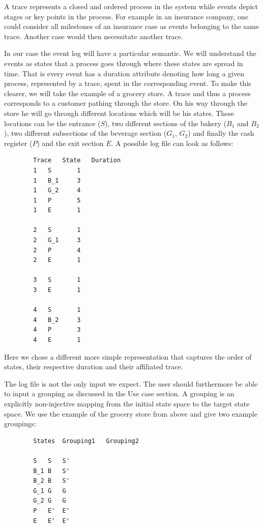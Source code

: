 \documentclass[12pt]{extarticle}
\begin{document}
A trace represents a closed and ordered process in the system while events depict stages or key points in the process. For example in an insurance company, one could consider all milestones of an insurance case as events belonging to the same trace. Another case would then necessitate another trace.

In our case the event log will have a particular semantic. We will understand the events as states that a process goes through where these states are spread in time. That is every event has a duration attribute denoting how long a given process, represented by a trace, spent in the corresponding event. To make this clearer, we will take the example of a grocery store. A trace and thus a process corresponds to a customer pathing through the store. On his way through the store he will go through different locations which will be his states. These locations can be the entrance ($S$), two different sections of the bakery ($B_1$ and $B_2$), two different subsections of the beverage section ($G_1$, $G_2$) and finally the cash register ($P$) and the exit section $E$. A possible log file can look as follows:

\begin{center}
    \begin{lstlisting}
        Trace	State   Duration
        1 	S   	1
        1 	B_1 	3
        1 	G_2 	4
        1 	P   	5
        1 	E   	1
        
        2 	S   	1
        2 	G_1 	3
        2 	P   	4
        2 	E   	1
        
        3 	S   	1
        3 	E   	1
        
        4 	S   	1
        4 	B_2 	3
        4 	P   	3
        4 	E   	1
    \end{lstlisting}
\end{center}


Here we chose a different more simple representation that captures the order of states, their respective duration and their affiliated trace.

The log file is not the only input we expect. The user should furthermore be able to input a grouping as discussed in the Use case section. A grouping is an explicitly non-injective mapping from the initial state space to the target state space. We use the example of the grocery store from above and give two example groupings:

\begin{center}
    \begin{lstlisting}
        States 	Grouping1	Grouping2
        
        S	S	S'
        B_1	B	S'
        B_2	B	S'
        G_1	G	G
        G_2	G	G
        P	E'	E'
        E	E'	E'
    \end{lstlisting}
\end{center}
\end{document}
